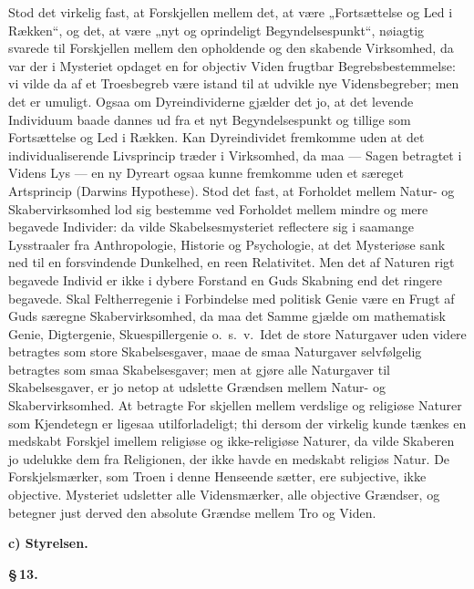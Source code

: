 \documentclass[12pt]{book}
\newcommand{\parmark}[1]{\begin{center}{\bfseries \S\,#1.}\end{center}}
\newcommand{\runhead}[1]{%
  \medskip\begin{center}{\bfseries #1}\end{center}\medskip}
\begin{document}
Stod det virkelig fast, at Forskjellen mellem det, at være
„Fortsættelse og Led i Rækken“, og det, at være „nyt og oprindeligt
Begyndelsespunkt“, nøiagtig svarede til Forskjellen mellem den
opholdende og den skabende Virksomhed, da var der i Mysteriet
opdaget en for objectiv Viden frugtbar Begrebsbestemmelse: vi vilde
da af et Troesbegreb være istand til at udvikle nye Vidensbegreber;
men det er umuligt. Ogsaa om Dyreindividerne gjælder det jo, at det
levende Individuum baade dannes ud fra et nyt Begyndelsespunkt og
tillige som Fortsættelse og Led i Rækken. Kan Dyreindividet
fremkomme uden at det individualiserende Livsprincip træder i
Virksomhed, da maa --- Sagen betragtet i Videns Lys --- en ny
Dyreart ogsaa kunne fremkomme uden et særeget Artsprincip (Darwins
Hypothese). Stod det fast, at Forholdet mellem Natur- og
Skabervirksomhed lod sig bestemme ved Forholdet mellem mindre og
mere begavede Individer: da vilde Skabelsesmysteriet reflectere sig
i saamange Lysstraaler fra Anthropologie, Historie og Psychologie,
at det Mysteriøse sank ned til en forsvindende Dunkelhed, en reen
Relativitet. Men det af Naturen rigt begavede Individ er ikke i
dybere Forstand en Guds Skabning end det ringere begavede. Skal
Feltherregenie i Forbindelse med politisk Genie være en Frugt af
Guds særegne Skabervirksomhed, da maa det Samme gjælde om
mathematisk Genie, Digtergenie, Skuespillergenie o.\ s.\ v.\ Idet de
store Naturgaver uden videre betragtes som store Skabelsesgaver,
maae de smaa Naturgaver selvfølgelig betragtes som smaa
Skabelsesgaver; men at gjøre alle Naturgaver til Skabelsesgaver, er
jo netop at udslette Grændsen mellem Natur- og Skabervirksomhed. At
betragte For\-
skjellen mellem verdslige og religiøse Naturer som Kjendetegn er
ligesaa utilforladeligt; thi dersom der virkelig kunde tænkes en
medskabt Forskjel imellem religiøse og ikke-religiøse Naturer, da
vilde Skaberen jo udelukke dem fra Religionen, der ikke havde en
medskabt religiøs Natur. De Forskjelsmærker, som Troen i denne
Henseende sætter, ere subjective, ikke objective. Mysteriet
udsletter alle Vidensmærker, alle objective Grændser, og betegner
just derved den absolute Grændse mellem Tro og Viden.

\runhead{c) Styrelsen.}
\parmark{13}
\end{document}

